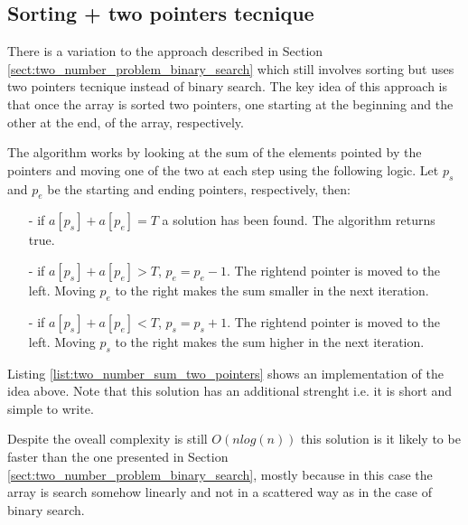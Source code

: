 


\subsection{Sorting + two pointers tecnique}
There is a variation to the approach described in Section \ref{sect:two_number_problem_binary_search} which still involves sorting but uses two pointers tecnique instead of binary search.
The key idea of this approach is that once the array is sorted two pointers, one starting at the beginning and the other at the end, of the array, respectively.

The algorithm works by looking at the sum of the elements pointed by the pointers and moving one of the two at each step using the following logic. Let $p_s$ and $p_e$ be the starting and ending pointers, respectively, then:
\begin{itemize}
	\item[-] if $a[p_s]+a[p_e] = T$ a solution has been found. The algorithm returns true.
	\item[-] if $a[p_s]+a[p_e] > T$, $p_e=p_e-1$. The rightend pointer is moved to the left. Moving $p_e$ to the right makes the sum smaller in the next iteration. 
	\item[-] if $a[p_s]+a[p_e] < T$, $p_s=p_s+1$. The rightend pointer is moved to the left. Moving $p_s$ to the right makes the sum higher in the next iteration. 
\end{itemize}

Listing \ref{list:two_number_sum_two_pointers} shows an implementation of the idea above.  Note that this solution has an additional strenght i.e.  it is short and simple to write. 



Despite the oveall complexity is still $O(n log(n))$ this solution is it likely to be faster than the one presented in Section \ref{sect:two_number_problem_binary_search}, mostly because in this case the array is search somehow linearly and not in a scattered way as in the case of binary search.

